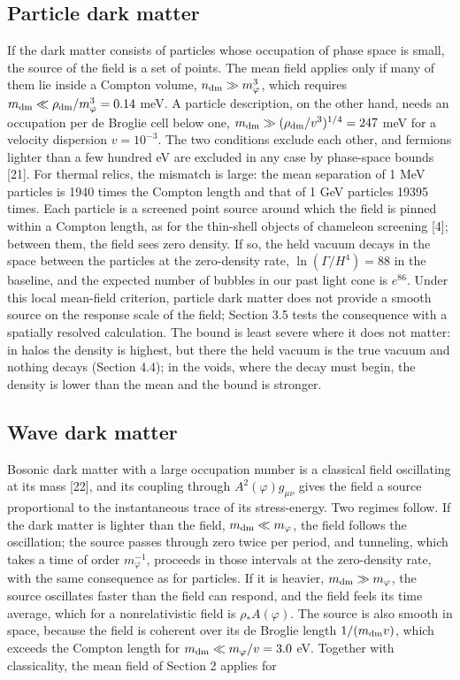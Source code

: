 \documentclass[preprint,12pt]{elsarticle}
\begin{document}
\subsection{Particle dark matter}
If the dark matter consists of particles whose occupation of phase space is small, the source of the field is a set of points. The mean field applies only if many of them lie inside a Compton volume, $n_{\rm dm}\gg m_\varphi^3$, which requires $m_{\rm dm}\ll\rho_{\rm dm}/m_\varphi^3=0.14$ meV. A particle description, on the other hand, needs an occupation per de Broglie cell below one, $m_{\rm dm}\gg(\rho_{\rm dm}/v^3)^{1/4}=247$ meV for a velocity dispersion $v=10^{-3}$. The two conditions exclude each other, and fermions lighter than a few hundred eV are excluded in any case by phase-space bounds [21]. For thermal relics, the mismatch is large: the mean separation of 1 MeV particles is 1940 times the Compton length and that of 1 GeV particles 19395 times. Each particle is a screened point source around which the field is pinned within a Compton length, as for the thin-shell objects of chameleon screening [4]; between them, the field sees zero density. If so, the held vacuum decays in the space between the particles at the zero-density rate, $\ln(\Gamma/H^4)=88$ in the baseline, and the expected number of bubbles in our past light cone is $e^{86}$. Under this local mean-field criterion, particle dark matter does not provide a smooth source on the response scale of the field; Section 3.5 tests the consequence with a spatially resolved calculation. The bound is least severe where it does not matter: in halos the density is highest, but there the held vacuum is the true vacuum and nothing decays (Section 4.4); in the voids, where the decay must begin, the density is lower than the mean and the bound is stronger.

\subsection{Wave dark matter}
Bosonic dark matter with a large occupation number is a classical field oscillating at its mass [22], and its coupling through $A^2(\varphi)g_{\mu\nu}$ gives the field a source proportional to the instantaneous trace of its stress-energy. Two regimes follow. If the dark matter is lighter than the field, $m_{\rm dm}\ll m_\varphi$, the field follows the oscillation; the source passes through zero twice per period, and tunneling, which takes a time of order $m_\varphi^{-1}$, proceeds in those intervals at the zero-density rate, with the same consequence as for particles. If it is heavier, $m_{\rm dm}\gg m_\varphi$, the source oscillates faster than the field can respond, and the field feels its time average, which for a nonrelativistic field is $\rho_*A(\varphi)$. The source is also smooth in space, because the field is coherent over its de Broglie length $1/(m_{\rm dm}v)$, which exceeds the Compton length for $m_{\rm dm}\ll m_\varphi/v=3.0$ eV. Together with classicality, the mean field of Section 2 applies for
\end{document}

